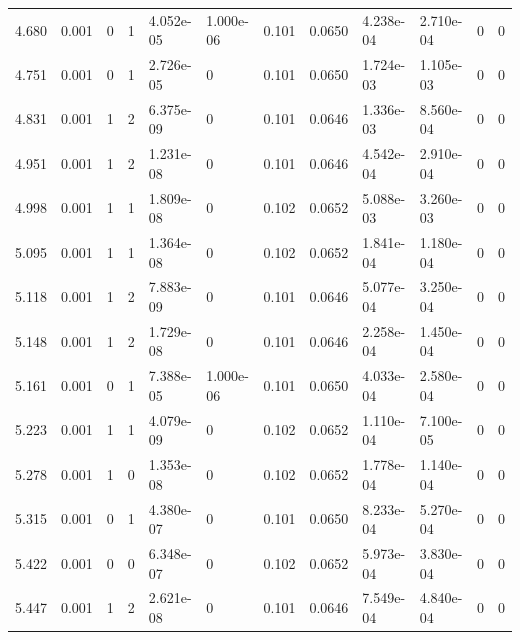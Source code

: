 \documentclass[preview]{standalone}
\begin{document}
{{{\begin{tabular}{L{1.2cm}C{1.2cm} C{0.3cm}C{0.5cm} C{1.4cm}C{1.4cm} C{1.4cm}C{1.4cm} C{1.6cm}C{1.6cm} C{1.6cm}C{1.6cm}}
  4.680  &  0.001  & 0     &  1 &  4.052e-05  & 1.000e-06  &  0.101&   0.0650& 4.238e-04 & 2.710e-04   &  0 & 0  \\ 
  4.751  &  0.001  & 0     &  1 &  2.726e-05  & 0  &  0.101&   0.0650& 1.724e-03 & 1.105e-03   &  0 & 0  \\ 
  4.831  &  0.001  & 1     &  2 &  6.375e-09  & 0  &  0.101&   0.0646& 1.336e-03 & 8.560e-04   &  0 & 0  \\ 
  4.951  &  0.001  & 1     &  2 &  1.231e-08  & 0  &  0.101&   0.0646& 4.542e-04 & 2.910e-04   &  0 & 0  \\ 
  4.998  &  0.001  & 1     &  1 &  1.809e-08  & 0  &  0.102&   0.0652& 5.088e-03 & 3.260e-03   &  0 & 0  \\ 
  5.095  &  0.001  & 1     &  1 &  1.364e-08  & 0  &  0.102&   0.0652& 1.841e-04 & 1.180e-04   &  0 & 0  \\ 
  5.118  &  0.001  & 1     &  2 &  7.883e-09  & 0  &  0.101&   0.0646& 5.077e-04 & 3.250e-04   &  0 & 0  \\ 
  5.148  &  0.001  & 1     &  2 &  1.729e-08  & 0  &  0.101&   0.0646& 2.258e-04 & 1.450e-04   &  0 & 0  \\ 
  5.161  &  0.001  & 0     &  1 &  7.388e-05  & 1.000e-06  &  0.101&   0.0650& 4.033e-04 & 2.580e-04   &  0 & 0  \\ 
  5.223  &  0.001  & 1     &  1 &  4.079e-09  & 0  &  0.102&   0.0652& 1.110e-04 & 7.100e-05   &  0 & 0  \\ 
  5.278  &  0.001  & 1     &  0 &  1.353e-08  & 0  &  0.102&   0.0652& 1.778e-04 & 1.140e-04   &  0 & 0  \\ 
  5.315  &  0.001  & 0     &  1 &  4.380e-07  & 0  &  0.101&   0.0650& 8.233e-04 & 5.270e-04   &  0 & 0  \\ 
  5.422  &  0.001  & 0     &  0 &  6.348e-07  & 0  &  0.102&   0.0652& 5.973e-04 & 3.830e-04   &  0 & 0  \\ 
  5.447  &  0.001  & 1     &  2 &  2.621e-08  & 0  &  0.101&   0.0646& 7.549e-04 & 4.840e-04   &  0 & 0  \\ 
\hline 
\end{tabular} 

}}}
\end{document}
